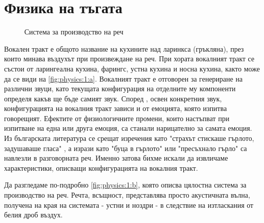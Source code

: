 \documentclass[main.tex]{subfiles}
\begin{document}
\section{Физика на тъгата}
    
    \begin{figure}[ht]%
        \centering
        \begin{changemargin}{0cm}{0cm} 
             \hspace{0.8cm}
        \end{changemargin} 
        \caption{Система за производство на реч}%
        \label{fig:physics:1}
    \end{figure}

    Вокален тракт е общото название на кухините над ларинкса (гръкляна), през които минава въздухът при произвеждане на реч.
    При хората вокалният тракт се състои от ларингеална кухина, фарингс, устна кухина и носна кухина, както може да се види на \autoref{fig:physics:1:a}. Вокалният тракт е отговорен за генериране на различни звуци, като текущата конфигурация на отделните му компоненти определя какъв ще бъде самият звук.
    Според \cite{emotional:shit}, освен конкретния звук, конфигурацията на вокалния тракт зависи и от емоцията, която изпитва говорещият. Ефектите от физиологичните промени,
    които настъпват при изпитване на една или друга емоция, са станали нарицателно за самата емоция. Из българската литература се срещат изречения като "страхът стискаше гърлото, задушаваше гласа" \cite{talev}, а 
    изрази като "буца в гърлото" или "пресъхнало гърло" са навлезли в разговорната реч.
    Именно затова бихме искали да извличаме характеристики, описващи конфигурацията на вокалния тракт.

    
    Да разгледаме по-подробно \autoref{fig:physics:1:b}, която описва цялостна система за производство на реч.
    Речта, всъщност, представлява просто акустичната вълна, получена на края на системата - устни и ноздри - в следствие на изтласкания от белия дроб въздух.
\end{document}
